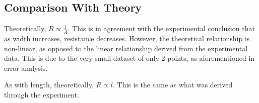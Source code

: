 \documentclass[12pt]{article}
\begin{document}
\subsection{Comparison With Theory}

Theoretically, $R \propto \frac{1}{A}$. This is in agreement with the experimental conclusion that as width increases, resistance decreases. However, the theoretical relationship is non-linear, as opposed to the linear relationship derived from the experimental data. This is due to the very small dataset of only 2 points, as aforementioned in error analysis.

\noindent
As with length, theoretically, $R \propto l$. This is the same as what was derived through the experiment.
\end{document}

